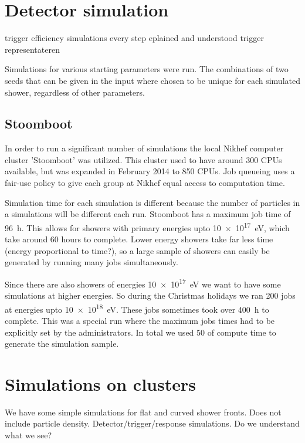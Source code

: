 \section{Detector simulation}

trigger efficiency
simulations
every step eplained and understood
trigger representateren

Simulations for various starting parameters were run. The combinations
of two seeds that can be given in the input where chosen to be unique
for each simulated shower, regardless of other parameters.


\subsection{Stoomboot}

In order to run a significant number of simulations the local Nikhef
computer cluster 'Stoomboot' was utilized. This cluster used to have
around 300 CPUs available, but was expanded in February 2014 to 850
CPUs. Job queueing uses a fair-use policy to give each group at Nikhef
equal access to computation time.

Simulation time for each simulation is different because the number of
particles in a simulations will be different each run. Stoomboot has a
maximum job time of \SI{96}{\hour}. This allows for showers with primary
energies upto \SI{10e17}{\electronvolt}, which take around 60 hours to
complete. Lower energy showers take far less time (energy proportional
to time?), so a large sample of showers can easily be generated by
running many jobs simultaneously.

Since there are also showers of energies \SI{10e17}{\electronvolt} we
want to have some simulations at higher energies. So during the
Christmas holidays we ran 200 jobs at energies upto
\SI{10e18}{\electronvolt}. These jobs sometimes took over
\SI{400}{\hour} to complete. This was a special run where the maximum
jobs times had to be explicitly set by the administrators. In total we
used \SI{50}{\year} of compute time to generate the simulation sample.



\section{Simulations on clusters}

We have some simple simulations for flat and curved shower fronts.
Does not include particle density.
Detector/trigger/response simulations. Do we understand what we see?


